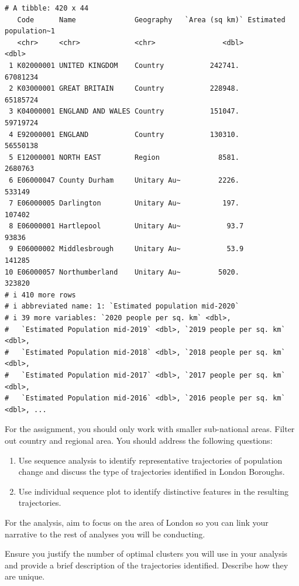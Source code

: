 \documentclass[
  letterpaper,
  DIV=11,
  numbers=noendperiod]{scrreprt}
\begin{document}
\begin{verbatim}
# A tibble: 420 x 44
   Code      Name              Geography   `Area (sq km)` Estimated population~1
   <chr>     <chr>             <chr>                <dbl>                  <dbl>
 1 K02000001 UNITED KINGDOM    Country           242741.                67081234
 2 K03000001 GREAT BRITAIN     Country           228948.                65185724
 3 K04000001 ENGLAND AND WALES Country           151047.                59719724
 4 E92000001 ENGLAND           Country           130310.                56550138
 5 E12000001 NORTH EAST        Region              8581.                 2680763
 6 E06000047 County Durham     Unitary Au~         2226.                  533149
 7 E06000005 Darlington        Unitary Au~          197.                  107402
 8 E06000001 Hartlepool        Unitary Au~           93.7                  93836
 9 E06000002 Middlesbrough     Unitary Au~           53.9                 141285
10 E06000057 Northumberland    Unitary Au~         5020.                  323820
# i 410 more rows
# i abbreviated name: 1: `Estimated population mid-2020`
# i 39 more variables: `2020 people per sq. km` <dbl>,
#   `Estimated Population mid-2019` <dbl>, `2019 people per sq. km` <dbl>,
#   `Estimated Population mid-2018` <dbl>, `2018 people per sq. km` <dbl>,
#   `Estimated Population mid-2017` <dbl>, `2017 people per sq. km` <dbl>,
#   `Estimated Population mid-2016` <dbl>, `2016 people per sq. km` <dbl>, ...
\end{verbatim}

For the assignment, you should only work with smaller sub-national
areas. Filter out country and regional area. You should address the
following questions:

\begin{enumerate}
\def\labelenumi{\arabic{enumi}.}
\item
  Use sequence analysis to identify representative trajectories of
  population change and discuss the type of trajectories identified in
  London Boroughs.
\item
  Use individual sequence plot to identify distinctive features in the
  resulting trajectories.
\end{enumerate}

For the analysis, aim to focus on the area of London so you can link
your narrative to the rest of analyses you will be conducting.

Ensure you justify the number of optimal clusters you will use in your
analysis and provide a brief description of the trajectories identified.
Describe how they are unique.
\end{document}
